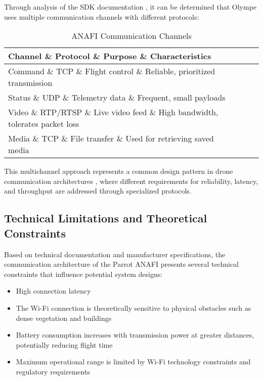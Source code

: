 Through analysis of the SDK documentation \cite{ParrotOlympeDoc}, it can be determined that Olympe uses multiple communication channels with different protocols:

\begin{table}[h]
\centering
\caption{ANAFI Communication Channels}
\label{tab:anafi_channels}
\begin{tabular}{@{}llll@{}}
\toprule
\textbf{Channel} \& \textbf{Protocol} \& \textbf{Purpose} \& \textbf{Characteristics} \\
\midrule
Command \& TCP \& Flight control \& Reliable, prioritized transmission \\
Status \& UDP \& Telemetry data \& Frequent, small payloads \\
Video \& RTP/RTSP \& Live video feed \& High bandwidth, tolerates packet loss \\
Media \& TCP \& File transfer \& Used for retrieving saved media \\
\bottomrule
\end{tabular}
\end{table}

This multichannel approach represents a common design pattern in drone communication architectures \cite{Chmaj2015}, where different requirements for reliability, latency, and throughput are addressed through specialized protocols.

\subsection{Technical Limitations and Theoretical Constraints}

Based on technical documentation and manufacturer specifications, the communication architecture of the Parrot ANAFI presents several technical constraints that influence potential system designs:

\begin{itemize}
    \item High connection latency \cite{Chanana2024}
    \item The Wi-Fi connection is theoretically sensitive to physical obstacles such as dense vegetation and buildings \cite{Genc2017}
    \item Battery consumption increases with transmission power at greater distances, potentially reducing flight time \cite{Zeng2016}
    \item Maximum operational range is limited by Wi-Fi technology constraints and regulatory requirements \cite{ParrotANAFISpec}
\end{itemize}

